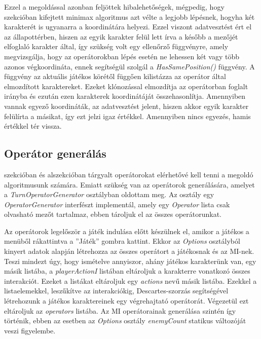 \documentclass[
]{thesis-ekf}
\theoremstyle{definition}
\theoremstyle{remark}
\begin{document}
Ezzel a megoldással azonban feljöttek hibalehetőségek, mégpedig, hogy  szekcióban kifejtett minimax algoritmus azt vélte a legjobb lépésnek, hogyha két karakterét is ugyanarra a koordinátára helyezi. Ezzel viszont adatvesztést ért el az állapottérben, hiszen az egyik karakter felül lett írva a később a mezőjét elfoglaló karakter által, így szükség volt egy ellenőrző függvényre, amely megvizsgálja, hogy az operátorokban lépés esetén ne lehessen két vagy több azonos végkoordináta, ennek segítségül szolgál a \emph{HasSamePosition()} függvény. A függvény az aktuális játékos körétől függően kilistázza az operátor által elmozdított karaktereket. Ezeket klónozással elmozdítja az operátorban foglalt irányba és ezután ezen karakterek koordinátáját összehasonlítja. Amennyiben vannak egyező koordináták, az adatvesztést jelent, hiszen akkor egyik karakter felülírta a másikat, így ezt jelzi igaz értékkel. Amennyiben nincs egyezés, hamis értékkel tér vissza.

\subsection{Operátor generálás} \label{operatorgen}

 szekcióban és  alszekcióban tárgyalt operátorokat elérhetővé kell tenni a megoldó algoritmusunk számára. Emiatt szükség van az operátorok generálására, amelyet a \emph{TurnOperatorGenerator} osztályban oldottam meg. Az osztály egy \emph{OperatorGenerator} interfészt implementál, amely egy \emph{Operator} lista csak olvasható mezőt tartalmaz, ebben tároljuk el az összes operátorunkat.

Az operátorok legelőször a játék indulása előtt készülnek el, amikor a játékos a menüből rákattintva a ''Játék'' gombra kattint. Ekkor az \emph{Options} osztályból kinyert adatok alapján létrehozza az összes operátort a játékosnak és az MI-nek. Teszi mindezt úgy, hogy ismételve annyiszor, ahány játékos karakterünk van, egy másik listába, a \emph{playerActionI} listában eltároljuk a karakterre vonatkozó összes interakciót. Ezeket a listákat eltároljuk egy \emph{actions} nevű másik listába. Ezekkel a listaelemekkel, leszűkítve az interakciókig, Descartes-szorzás segítségével létrehozunk a játékos karaktereinek egy végrehajtató operátorát. Végezetül ezt eltároljuk az \emph{operators} listába. Az MI operátorainak generálása szintén így történik, ebben az esetben az \emph{Options} osztály \emph{enemyCount} statikus változóját veszi figyelembe.
\end{document}
